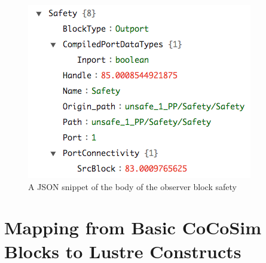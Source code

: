 \documentclass{article}
\begin{document}
\begin{figure}[h]
\begin{center}
    \includegraphics[scale=0.35]{figures/safety6}       
    
\end{center}  
  \caption{A JSON snippet of the body of the observer block \textsf{safety}}
  \label{jsonsafetybody}
\end{figure}

\section{Mapping from Basic CoCoSim Blocks to Lustre Constructs}
\end{document}
